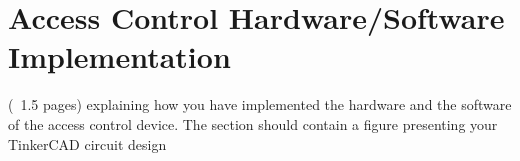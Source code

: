 \section{Access Control Hardware/Software Implementation }
(~1.5 pages) explaining how you have implemented the hardware and the software of the access control device. The section should contain a figure presenting your TinkerCAD circuit design